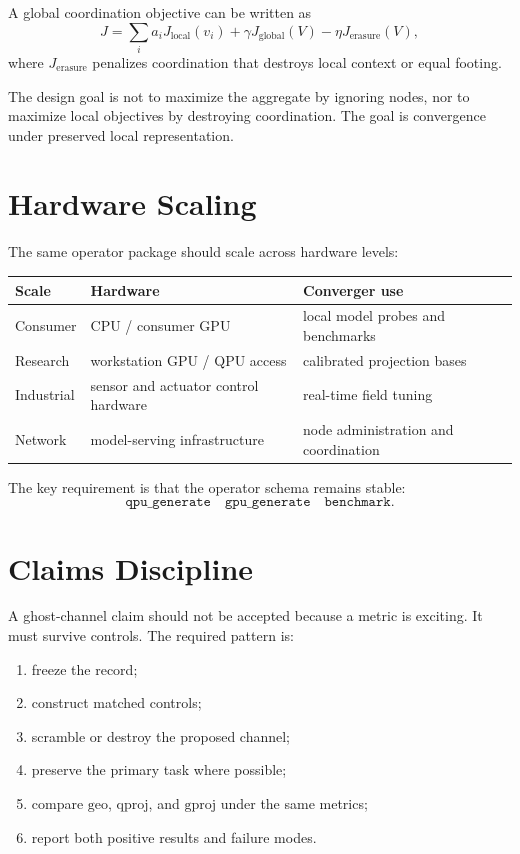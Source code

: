 \documentclass[11pt]{article}
\newcommand{\geo}{\mathrm{geo}}
\newcommand{\qproj}{\mathrm{qproj}}
\newcommand{\gproj}{\mathrm{gproj}}
\begin{document}
A global coordination objective can be written as
\begin{equation}
  J =
  \sum_i a_i J_{\mathrm{local}}(v_i)
  +
  \gamma J_{\mathrm{global}}(V)
  -
  \eta J_{\mathrm{erasure}}(V),
\end{equation}
where \(J_{\mathrm{erasure}}\) penalizes coordination that destroys local
context or equal footing.

The design goal is not to maximize the aggregate by ignoring nodes, nor to
maximize local objectives by destroying coordination. The goal is convergence
under preserved local representation.

\section{Hardware Scaling}

The same operator package should scale across hardware levels:
\begin{center}
\begin{tabular}{lll}
\toprule
\textbf{Scale} & \textbf{Hardware} & \textbf{Converger use} \\
\midrule
Consumer & CPU / consumer GPU & local model probes and benchmarks \\
Research & workstation GPU / QPU access & calibrated projection bases \\
Industrial & sensor and actuator control hardware & real-time field tuning \\
Network & model-serving infrastructure & node administration and coordination \\
\bottomrule
\end{tabular}
\end{center}

The key requirement is that the operator schema remains stable:
\[
  \texttt{qpu\_generate}
  \quad
  \texttt{gpu\_generate}
  \quad
  \texttt{benchmark}.
\]

\section{Claims Discipline}

A ghost-channel claim should not be accepted because a metric is exciting. It
must survive controls. The required pattern is:
\begin{enumerate}
  \item freeze the record;
  \item construct matched controls;
  \item scramble or destroy the proposed channel;
  \item preserve the primary task where possible;
  \item compare \(\geo\), \(\qproj\), and \(\gproj\) under the same metrics;
  \item report both positive results and failure modes.
\end{enumerate}
\end{document}
